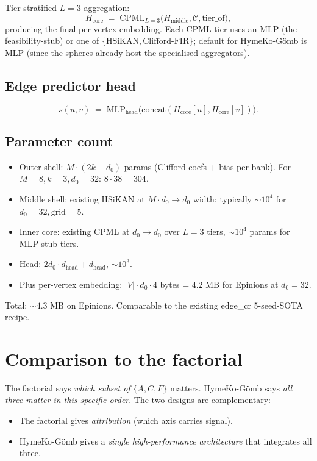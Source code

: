\documentclass[11pt]{article}
\begin{document}
Tier-stratified $L=3$ aggregation:
\[
  H_{\mathrm{core}} \;=\;
  \mathrm{CPML}_{L=3}\big(H_{\mathrm{middle}}, \mathcal{C},
                          \mathrm{tier\_of}\big),
\]
producing the final per-vertex embedding. Each CPML tier uses an
MLP (the feasibility-stub) or one of $\{\mathrm{HSiKAN}, \mathrm{Clifford\text{-}FIR}\}$;
default for HymeKo-Gömb is MLP (since the spheres already host the
specialised aggregators).

\subsection{Edge predictor head}

\[
  s(u, v) \;=\;
  \mathrm{MLP}_{\mathrm{head}}\big(\mathrm{concat}(H_{\mathrm{core}}[u], H_{\mathrm{core}}[v])\big).
\]

\subsection{Parameter count}

\begin{itemize}
  \item Outer shell: $M \cdot (2k + d_0)$ params (Clifford coefs
    + bias per bank). For $M=8, k=3, d_0=32$: $8 \cdot 38 = 304$.
  \item Middle shell: existing HSiKAN at $M \cdot d_0 \to d_0$
    width: typically $\sim 10^4$ for $d_0=32, \mathrm{grid}=5$.
  \item Inner core: existing CPML at $d_0 \to d_0$ over $L=3$ tiers,
    $\sim 10^4$ params for MLP-stub tiers.
  \item Head: $2 d_0 \cdot d_{\mathrm{head}} + d_{\mathrm{head}}$,
    $\sim 10^3$.
  \item Plus per-vertex embedding: $|V| \cdot d_0 \cdot 4$ bytes
    = $4.2$ MB for Epinions at $d_0=32$.
\end{itemize}

Total: $\sim 4.3$ MB on Epinions. Comparable to the existing
edge\_cr 5-seed-SOTA recipe.

\section{Comparison to the factorial}

The factorial says \emph{which subset of} $\{A, C, F\}$ matters.
HymeKo-Gömb says \emph{all three matter in this specific order}.
The two designs are complementary:

\begin{itemize}
  \item The factorial gives \emph{attribution} (which axis carries
    signal).
  \item HymeKo-Gömb gives a \emph{single high-performance architecture}
    that integrates all three.
\end{itemize}
\end{document}
